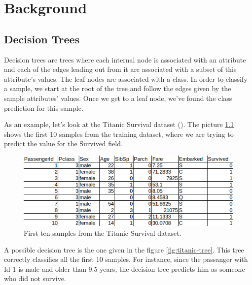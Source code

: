 \newpage

\chapter{Background}
\label{chap:background}

\section{Decision Trees}

Decision trees are trees where each internal node is associated with an attribute and each of the edges leading out from it are associated with a subset of this attribute's values. The leaf nodes are associated with a class. In order to classify a sample, we start at the root of the tree and follow the edges given by the sample attributes' values. Once we get to a leaf node, we've found the class prediction for this sample.

As an example, let's look at the Titanic Survival dataset (\cite{Titanic}). The picture \ref{fig:titanic-dataset} shows the first 10 samples from the training dataset, where we are trying to predict the value for the Survived field.

\begin{figure}[h]
\includegraphics[width=\textwidth]{titanic}
\caption{First ten samples from the Titanic Survival dataset.}
\label{fig:titanic-dataset}
\end{figure}

A possible decision tree is the one given in the figure \ref{fig:titanic-tree}. This tree correctly classifies all the first 10 samples. For instance, since the passanger with Id 1 is male and older than 9.5 years, the decision tree predicts him as someone who did not survive.

